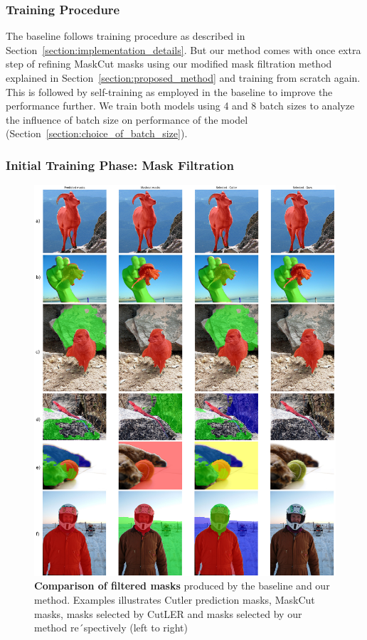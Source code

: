 \subsubsection{Training Procedure}
The baseline follows training procedure as described in Section~\ref{section:implementation_details}. But our method comes with once extra step of refining MaskCut masks using our modified mask filtration method explained in Section~\ref{section:proposed_method} and training from scratch again. This is followed by self-training as employed in the baseline to improve the performance further. We train both models using 4 and 8 batch sizes to analyze the influence of batch size on performance of the model (Section~\ref{section:choice_of_batch_size}). 

\subsubsection{Initial Training Phase: Mask Filtration}
\begin{figure}
	\centering
	\includegraphics[width=1\textwidth]{Images/main/filtered_mask_comparison.png}
	\caption[\textbf{Mask Filtration Outputs - Baseline vs Ours}]{\textbf{Comparison of filtered masks} produced by the baseline and our method. Examples illustrates Cutler prediction masks, MaskCut masks, masks selected by CutLER and masks selected by our method re´spectively (left to right)}
	\label{fig:filtered_mask_comparison}
\end{figure}
